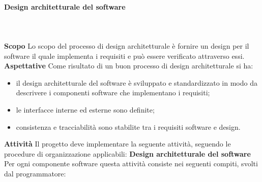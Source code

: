 			\paragraph{Design architetturale del software} \mbox{}\\ \mbox{}\\
			\textbf{Scopo}\newline \newline
			Lo scopo del processo di design architetturale è fornire un design per il software il quale implementa i requisiti e può essere verificato attraverso essi.
			\newline \newline
			\textbf{Aspettative}\newline \newline
			Come risultato di un buon processo di design architetturale si ha:
			\begin{itemize}
			\item il design architetturale del software è sviluppato e standardizzato in modo da descrivere i componenti software che implementano i requisiti;
			\item le interfacce interne ed esterne sono definite;
			\item consistenza e tracciabilità sono stabilite tra i requisiti software e design.
			\end{itemize}
			\textbf{Attività}\newline \newline
			Il progetto deve implementare la seguente attività, seguendo le procedure di organizzazione applicabili:\newline \newline
			\textbf{Design architetturale del software}\newline \newline
			Per ogni componente software questa attività consiste nei seguenti compiti, svolti dal programmatore:
			\newline \newline
